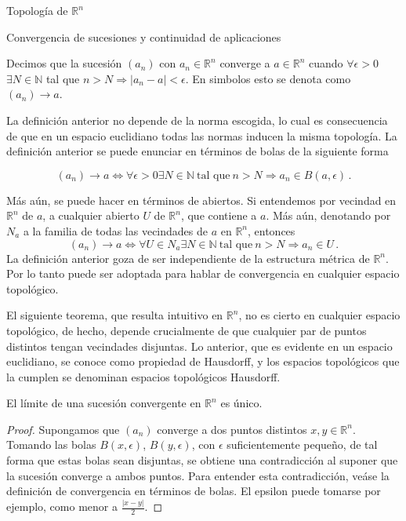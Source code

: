 \begin{chapter}{Topología de $\mathbb{R}^n$}
\begin{section}{Convergencia de sucesiones y continuidad de aplicaciones}
\begin{defn}

Decimos que la sucesión $(a_n)$ con $a_n \in \mathbb{R}^n$ converge a $a \in \mathbb{R}^n$ cuando $\forall \epsilon > 0$ $\exists N \in \mathbb{N}$ tal que $n > N \Rightarrow |a_n - a| < \epsilon$. En simbolos esto se denota como $(a_n) \to a$.

\end{defn}

La definición anterior no depende de la norma escogida, lo cual es consecuencia de que en un espacio euclidiano todas las normas inducen la misma topología. La definición anterior se puede enunciar en términos de bolas de la siguiente forma

$$(a_n) \to a  \iff \forall \epsilon > 0 \exists N \in \mathbb{N} \ \text{tal que} \ n>N \Rightarrow a_n \in B(a,\epsilon)\,.$$

Más aún, se puede hacer en términos de abiertos. Si entendemos por vecindad en $\mathbb{R}^n$ de $a$, a cualquier abierto $U$ de $\mathbb{R}^n$, que contiene a $a$. Más aún, denotando por $N_a$ a la familia de todas las vecindades de $a$ en $\mathbb{R}^n$, entonces
$$(a_n) \to a \iff \forall U \in N_a \exists N \in \mathbb{N} \ \text{tal que} \ n>N \Rightarrow a_n \in U\,.$$
La definición anterior goza de ser independiente de la estructura métrica de $\mathbb{R}^n$. Por lo tanto puede ser adoptada para hablar de convergencia en cualquier espacio topológico.

El siguiente teorema, que resulta intuitivo en $\mathbb{R}^n$, no es cierto en cualquier espacio topológico, de hecho, depende crucialmente de que cualquier par de puntos distintos tengan vecindades disjuntas. Lo anterior, que es evidente en un espacio euclidiano, se conoce como propiedad de Hausdorff, y los espacios topológicos que la cumplen se denominan espacios topológicos Hausdorff.

\begin{them}

El límite de una sucesión convergente en $\mathbb{R}^n$ es único.

\end{them}

\begin{proof}

Supongamos que $(a_n)$ converge a dos puntos distintos $x, y \in \mathbb{R}^n$. Tomando las bolas $B(x,\epsilon)$, $B(y, \epsilon)$, con $\epsilon$ suficientemente pequeño, de tal forma que estas bolas sean disjuntas, se obtiene una contradicción al suponer que la sucesión converge a ambos puntos. Para entender esta contradicción, veáse la definición de convergencia en términos de bolas. El epsilon puede tomarse por ejemplo, como menor a $\frac{|x-y|}{2}$.


\end{proof}
\end{section}
\end{chapter}
